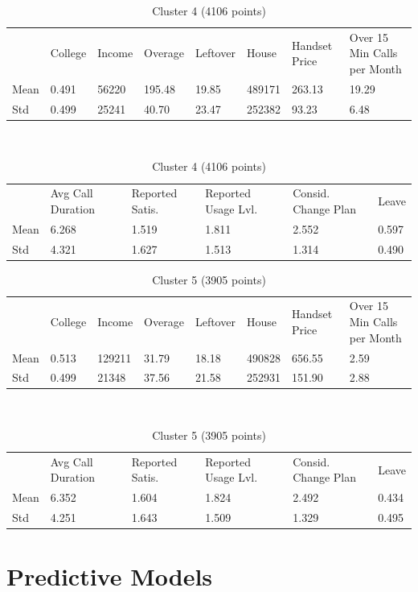 \documentclass[12pt, notitlepage]{article}
\begin{document}
\begin{table}[H]
	\centering
	\caption{Cluster 4 (4106 points)}
	\begin{tabular}{|l|l|l|l|l|l|l|l|}
		\cline{1-8}
		& College & Income & Overage & Leftover & House   & Handset Price & Over 15 Min Calls per Month \\
		\cline{1-8}
		Mean & 0.491 &  56220 &  195.48  &  19.85&  489171  & 263.13  &  19.29\\
		\cline{1-8}
		Std  & 0.499 &  25241  &  40.70   & 23.47 & 252382  &  93.23 &    6.48 \\
		\cline{1-8}
	\end{tabular}\\
	\begin{tabular}{|l|l|l|l|l|l|}
		\cline{1-6}
		& Avg Call Duration & Reported Satis. & Reported Usage Lvl. & Consid. Change Plan & Leave\\
		\cline{1-6}
		Mean &6.268 &  1.519 &   1.811 &  2.552 &   0.597\\
		\cline{1-6}
		Std & 4.321 &   1.627 &   1.513 &    1.314  &   0.490\\
		\cline{1-6}
	\end{tabular}
\end{table}
\begin{table}[H]
	\centering
	\caption{Cluster 5 (3905 points)}
	\begin{tabular}{|l|l|l|l|l|l|l|l|}
		\cline{1-8}
		& College & Income & Overage & Leftover & House   & Handset Price & Over 15 Min Calls per Month \\
		\cline{1-8}
		Mean & 0.513 & 129211  &  31.79  &  18.18 & 490828 &  656.55  &   2.59\\
		\cline{1-8}
		Std  & 0.499  & 21348 &   37.56 &   21.58 & 252931   &151.90   &  2.88 \\
		\cline{1-8}
	\end{tabular}\\
	\begin{tabular}{|l|l|l|l|l|l|}
		\cline{1-6}
		& Avg Call Duration & Reported Satis. & Reported Usage Lvl. & Consid. Change Plan & Leave\\
		\cline{1-6}
		Mean & 6.352  &   1.604  &   1.824   &  2.492  &   0.434\\
		\cline{1-6}
		Std & 4.251  &   1.643   &  1.509  &   1.329  &  0.495\\
		\cline{1-6}
	\end{tabular}
\end{table}

\section{Predictive Models}
\end{document}
